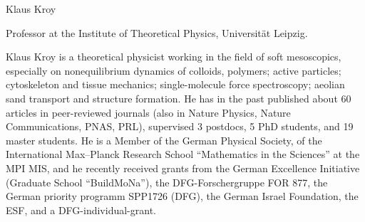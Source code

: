 \begin{participant}[type=leadPI,PM=12,gender=male,salary=5500]{Klaus Kroy}

Professor at the Institute of Theoretical Physics, Universität Leipzig.

Klaus Kroy is a theoretical physicist working in the field of soft mesoscopics, especially on nonequilibrium dynamics 
of colloids, polymers; active particles; cytoskeleton and tissue mechanics; single-molecule force spectroscopy; 
aeolian sand transport and structure formation. He has in the past published about 60 articles in peer-reviewed journals 
(also in Nature Physics, Nature Communications, PNAS, PRL), supervised 3 postdocs, 5 PhD students, and 19 master students. 
He is a Member of the German Physical Society, of the International Max--Planck Research School ``Mathematics in the Sciences''
at the MPI MIS, and he recently received grants from the German Excellence Initiative (Graduate School ``BuildMoNa''),
the DFG-Forschergruppe FOR 877, the German priority programm SPP1726 (DFG), the German Israel Foundation, the ESF, 
and a DFG-individual-grant.

\end{participant}
